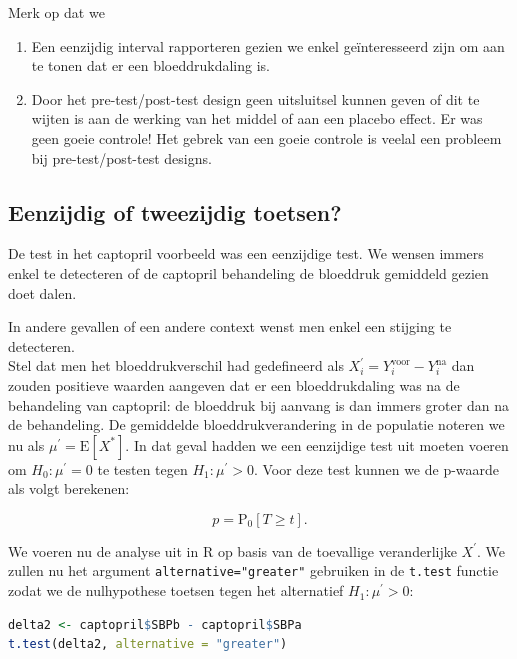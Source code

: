 \documentclass[
  12pt,dutch,coursenotes]{book}
\newcommand{\passthrough}[1]{#1}
\providecommand{\tightlist}{%
  \setlength{\itemsep}{0pt}\setlength{\parskip}{0pt}}
\theoremstyle{definition}
\theoremstyle{definition}
\theoremstyle{definition}
\theoremstyle{definition}
\theoremstyle{remark}
\begin{document}
Merk op dat we

\begin{enumerate}
\def\labelenumi{\arabic{enumi}.}
\tightlist
\item
  Een eenzijdig interval rapporteren gezien we enkel geïnteresseerd zijn om aan te tonen dat er een bloeddrukdaling is.
\item
  Door het pre-test/post-test design geen uitsluitsel kunnen geven of dit te wijten is aan de werking van het middel of aan een placebo effect. Er was geen goeie controle! Het gebrek van een goeie controle is veelal een probleem bij pre-test/post-test designs.
\end{enumerate}

\hypertarget{eenzijdig-of-tweezijdig-toetsen}{%
\subsection{Eenzijdig of tweezijdig toetsen?}\label{eenzijdig-of-tweezijdig-toetsen}}

De test in het captopril voorbeeld was een eenzijdige test. We wensen immers enkel te detecteren of de captopril behandeling de bloeddruk gemiddeld gezien doet dalen.

In andere gevallen of een andere context wenst men enkel een stijging te detecteren.\\
Stel dat men het bloeddrukverschil had gedefineerd als \(X_{i}^\prime=Y_{i}^\text{voor}-Y_{i}^\text{na}\) dan zouden positieve waarden aangeven dat er een bloeddrukdaling was na de behandeling van captopril: de bloeddruk bij aanvang is dan immers groter dan na de behandeling.
De gemiddelde bloeddrukverandering in de populatie noteren we nu als \(\mu^\prime=\text{E}[X^*]\).
In dat geval hadden we een eenzijdige test uit moeten voeren om \(H_0: \mu^\prime=0\) te testen tegen \(H_1: \mu^\prime>0\).
Voor deze test kunnen we de p-waarde als volgt berekenen:

\[p=\text{P}_0\left[T\geq t\right].\]

We voeren nu de analyse uit in R op basis van de toevallige veranderlijke \(X^\prime\). We zullen nu het argument \passthrough{\lstinline!alternative="greater"!} gebruiken in de \passthrough{\lstinline!t.test!} functie zodat we de nulhypothese toetsen tegen het alternatief \(H_1: \mu^\prime>0\):

\begin{lstlisting}[language=R]
delta2 <- captopril$SBPb - captopril$SBPa
t.test(delta2, alternative = "greater")
\end{lstlisting}
\end{document}
